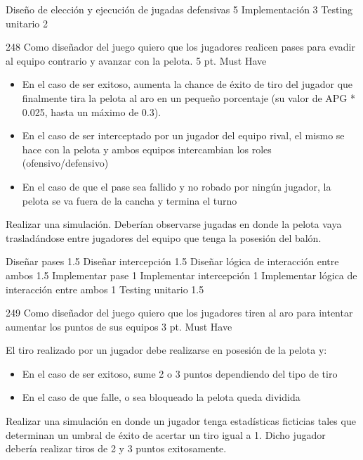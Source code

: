 \begin{taskstable}
 \task
 {Diseño de elección y ejecución de jugadas defensivas}
 {5}
 \task
 {Implementación}
 {3}
 \task
 {Testing unitario}
 {2}
\end{taskstable}

\vspace{1cm}


\sprintstory
{248}
{ Como diseñador del juego quiero que los jugadores realicen pases para evadir al equipo contrario y avanzar con la pelota.}
{5 pt.}
{Must Have}
{\begin{itemize}
	\item En el caso de ser exitoso, aumenta la chance de éxito de tiro del jugador que finalmente tira la pelota al aro en un pequeño porcentaje (su valor de APG * 0.025, hasta un máximo de 0.3).
	\item En el caso de ser interceptado por un jugador del equipo rival, el mismo se hace con la pelota y ambos equipos intercambian los roles (ofensivo/defensivo)
	\item En el caso de que el pase sea fallido y no robado por ningún jugador, la pelota se va fuera de la cancha y termina el turno
\end{itemize}}
{Realizar una simulación. Deberían observarse jugadas en donde la pelota vaya trasladándose entre jugadores del equipo que tenga la posesión del balón.}

\begin{taskstable}
 \task
 {Diseñar pases}
 {1.5}
 \task
 {Diseñar intercepción}
 {1.5}
 \task
 {Diseñar lógica de interacción entre ambos}
 {1.5}
 \task
 {Implementar pase}
 {1}
 \task
 {Implementar intercepción}
 {1}
 \task
 {Implementar lógica de interacción entre ambos}
 {1}
 \task
 {Testing unitario}
 {1.5}
\end{taskstable}
 
 \vspace{1cm}

\sprintstory
{249}
{Como diseñador del juego quiero que los jugadores tiren al aro para intentar aumentar los puntos de sus equipos}
{3 pt.}
{Must Have}
{El tiro realizado por un jugador debe realizarse en posesión de la pelota y:
\begin{itemize}
	\item En el caso de ser exitoso, sume 2 o 3 puntos dependiendo del tipo de tiro
	\item En el caso de que falle, o sea bloqueado la pelota queda dividida
\end{itemize}}
{Realizar una simulación en donde un jugador tenga estadísticas ficticias tales que determinan un umbral de éxito de acertar un tiro igual a 1.
Dicho jugador debería realizar tiros de 2 y 3 puntos exitosamente.}

